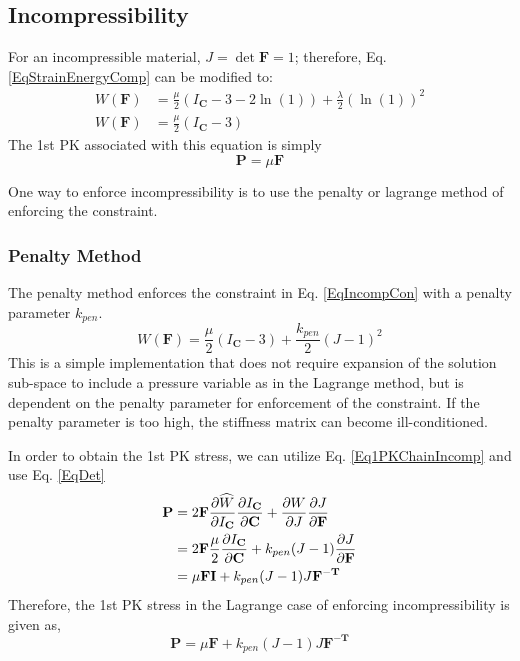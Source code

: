 \documentclass[12pt,3p]{article}
\begin{document}
\subsection{Incompressibility}
\vspace{-1ex}
For an incompressible material, $J = \det \mathbf{F} = 1$; therefore, Eq. \ref{EqStrainEnergyComp} can be modified to: 
\begin{align*}
W (\mathbf{F}) &= \frac{\mu}{2} (I_\mathbf{C} - 3 - 2 \ln (1)) + \frac{\lambda}{2} (\ln (1))^2 \\
W (\mathbf{F}) &= \frac{\mu}{2} (I_\mathbf{C} - 3) 
\end{align*}
The 1st PK associated with this equation is simply
\begin{equation}\label{EqIncompPK}
\mathbf{P} = \mu \mathbf{F}
\end{equation}

One way to enforce incompressibility is to use the penalty or lagrange method of enforcing the constraint. 


\subsubsection{Penalty Method}
\vspace{-1ex}
The penalty method enforces the constraint in Eq. \ref{EqIncompCon} with a penalty parameter $k_{pen}$.
\begin{equation}\label{EqEnergyDensityPenalty}
W(\mathbf{F}) = \frac{\mu}{2} (I_\mathbf{C} - 3) + \frac{ k_{pen}}{2} (J-1)^2
\end{equation}
This is a simple implementation that does not require expansion of the solution sub-space to include a pressure variable as in the Lagrange method, but is dependent on the penalty parameter for enforcement of the constraint. If the penalty parameter is too high, the stiffness matrix can become ill-conditioned. 

In order to obtain the 1st PK stress, we can utilize Eq. \ref{Eq1PKChainIncomp} and use Eq. \ref{EqDet}
\begin{align*}
\mathbf{P}
	&=2 \mathbf{F}  \pdv{\widehat{W}}{I_\mathbf{C}} \pdv{I_\mathbf{C}}{\mathbf{C}} + \pdv{W}{J} \pdv{J}{\mathbf{F}} \\
	&= 2 \mathbf{F} \frac{\mu}{2} \pdv{I_\mathbf{C}}{\mathbf{C}} + k_{pen}(J-1) \pdv{J}{\mathbf{F}} \\
	&= \mu \mathbf{F} \mathbf{I} + k_{pen} (J-1) J \mathbf{F^{-T}} 
\end{align*}
Therefore, the 1st PK stress in the Lagrange case of enforcing incompressibility is given as, 
\begin{equation}\label{EqPenalty1PK}
\mathbf{P} = \mu \mathbf{F} + k_{pen} (J-1) J \mathbf{F^{-T}} 
\end{equation}
\end{document}
